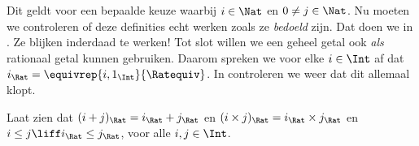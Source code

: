 \documentclass[openany]{memoir}
\begin{document}
Dit geldt voor een bepaalde keuze waarbij $i \in \Nat$ en $0 \neq j \in \Nat$.
Nu moeten we controleren of deze definities echt werken zoals ze
\emph{bedoeld} zijn. Dat doen we in . Ze blijken
inderdaad te werken!{} Tot slot willen we een geheel getal ook \emph{als}
rationaal getal kunnen gebruiken. Daarom spreken we voor elke $i \in
\Int$ af dat $i_\Rat = \equivrep{i, 1_\Int}{\Ratequiv}$. In
 controleren we weer dat dit allemaal klopt.
\begin{prob}
Laat zien dat $(i + j)_\Rat = i_\Rat+ j_\Rat$ en $(i \times j)_\Rat =
i_\Rat \times j_\Rat$ en $i \leq j \liff i_\Rat \leq j_\Rat$, voor alle
$i, j \in \Int$.
\end{prob}
\endgroup

\begingroup
\def\olfilename{OLP-0044}
\def\olfilepath{content/sets-functions-relations/arithmetization/}
\hypertarget{unit-OLP-0044}{}
\end{document}
